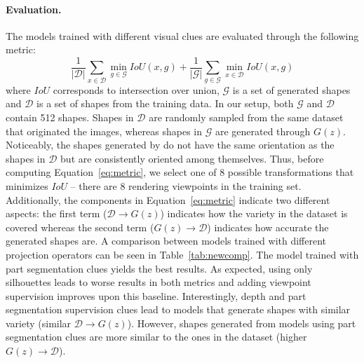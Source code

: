 \paragraph{Evaluation.}
The models trained with different visual clues are evaluated through the following metric:
\begin{equation}
	\frac{1}{|\mathcal{D}|}\sum_{x \in \mathcal{D}} \min_{g \in \mathcal{G}} IoU(x, g) +
	\frac{1}{|\mathcal{G}|}\sum_{g \in \mathcal{G}} \min_{x \in \mathcal{D}} IoU(x, g) 
	\label{eq:metric}
\end{equation}
where $IoU$ corresponds to intersection over union, $\mathcal{G}$ is a set of generated shapes and
$\mathcal{D}$ is a set of shapes from the training data.
In our setup, both $\mathcal{G}$ and $\mathcal{D}$ contain 512 shapes.
Shapes in $\mathcal{D}$ are randomly sampled from the same dataset that originated the images,
whereas shapes in $\mathcal{G}$ are generated through $G(z)$.
Noticeably, the shapes generated by \prgan do not have the same orientation as the shapes
in $\mathcal{D}$ but are consistently oriented among themselves.
Thus, before computing Equation~\ref{eq:metric}, we select one of 8 possible transformations that minimizes
$IoU$ -- there are 8 rendering viewpoints in the training set.
Additionally, the components in Equation~\ref{eq:metric} indicate two different aspects:
the first term ($\mathcal{D}\rightarrow G(z)$) indicates how the variety in the dataset is covered whereas 
the second term ($G(z)\rightarrow \mathcal{D}$) indicates how accurate the generated shapes are.
A comparison between models trained with different projection operators can be seen in
Table~\ref{tab:newcomp}.
The model trained with part segmentation clues yields the best results.
As expected, using only silhouettes leads to worse results in both metrics and adding viewpoint
supervision improves upon this baseline.
Interestingly, depth and part segmentation supervision clues lead to models that generate shapes
with similar variety (similar $\mathcal{D}\rightarrow G(z)$).
However, shapes generated from models using part segmentation clues are more similar to the ones
in the dataset (higher $G(z)\rightarrow \mathcal{D}$).

